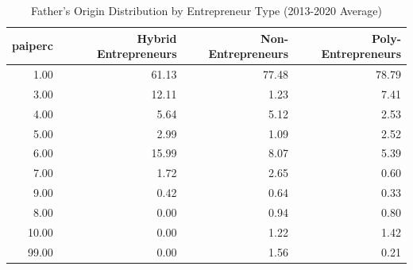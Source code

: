 \begin{table}[ht]
\centering
\caption{Father's Origin Distribution by Entrepreneur Type (2013-2020 Average)} 
\label{tab:characteristics_father_origin_avg}
\begin{tabular}{rrrr}
  \toprule
paiperc & Hybrid Entrepreneurs & Non-Entrepreneurs & Poly-Entrepreneurs \\ 
  \midrule
1.00 & 61.13 & 77.48 & 78.79 \\ 
  3.00 & 12.11 & 1.23 & 7.41 \\ 
  4.00 & 5.64 & 5.12 & 2.53 \\ 
  5.00 & 2.99 & 1.09 & 2.52 \\ 
  6.00 & 15.99 & 8.07 & 5.39 \\ 
  7.00 & 1.72 & 2.65 & 0.60 \\ 
  9.00 & 0.42 & 0.64 & 0.33 \\ 
  8.00 & 0.00 & 0.94 & 0.80 \\ 
  10.00 & 0.00 & 1.22 & 1.42 \\ 
  99.00 & 0.00 & 1.56 & 0.21 \\ 
   \bottomrule
\end{tabular}
\end{table}
